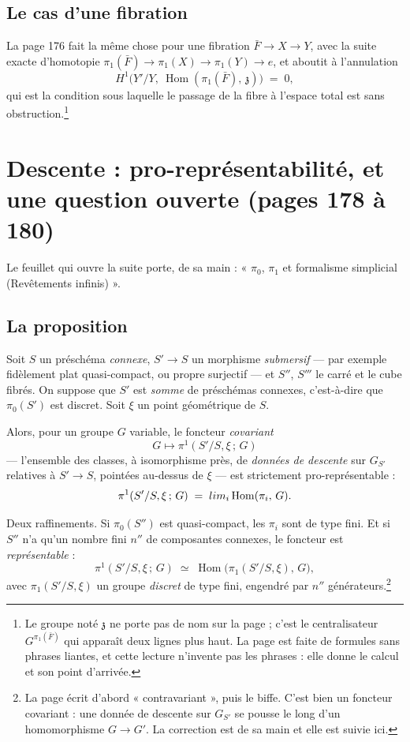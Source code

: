 \documentclass[11pt,a4paper]{article}
\begin{document}
\subsection*{Le cas d'une fibration}

La page 176 fait la même chose pour une fibration $\bar{F} \to X \to Y$, avec
la suite exacte d'homotopie $\pi_{1}(\bar{F}) \to \pi_{1}(X) \to \pi_{1}(Y)
\to e$, et aboutit à l'annulation
\[
  H^{1}\bigl(Y'/Y,\ \operatorname{Hom}(\pi_{1}(\bar{F}),\, \mathfrak{z})\bigr)
  \;=\; 0 ,
\]
qui est la condition sous laquelle le passage de la fibre à l'espace total est
sans obstruction.\footnote{Le groupe noté $\mathfrak{z}$ ne porte pas de nom
sur la page ; c'est le centralisateur $G^{\pi_{1}(\bar{F})}$ qui apparaît deux
lignes plus haut. La page est faite de formules sans phrases liantes, et cette
lecture n'invente pas les phrases : elle donne le calcul et son point
d'arrivée.}

\section*{Descente : pro-représentabilité, et une question ouverte (pages 178 à 180)}

Le feuillet qui ouvre la suite porte, de sa main : « $\pi_{0}$, $\pi_{1}$ et
formalisme simplicial (Revêtements infinis) ».

\subsection*{La proposition}

Soit $S$ un préschéma \emph{connexe}, $S' \to S$ un morphisme
\emph{submersif} --- par exemple fidèlement plat quasi-compact, ou propre
surjectif --- et $S''$, $S'''$ le carré et le cube fibrés. On suppose que $S'$
est \emph{somme} de préschémas connexes, c'est-à-dire que $\pi_{0}(S')$ est
discret. Soit $\xi$ un point géométrique de $S$.

Alors, pour un groupe $G$ variable, le foncteur \emph{covariant}
\[
  G \longmapsto \pi^{1}(S'/S, \xi\,;\, G)
\]
--- l'ensemble des classes, à isomorphisme près, de \emph{données de descente}
sur $G_{S'}$ relatives à $S' \to S$, pointées au-dessus de $\xi$ --- est
strictement pro-représentable :
\[
  \pi^{1}(S'/S, \xi\,;\, G) \;=\; \varinjlim_{i}
  \operatorname{Hom}(\pi_{i},\, G) .
\]

Deux raffinements. Si $\pi_{0}(S'')$ est quasi-compact, les $\pi_{i}$ sont de
type fini. Et si $S''$ n'a qu'un nombre fini $n''$ de composantes connexes, le
foncteur est \emph{représentable} :
\[
  \pi^{1}(S'/S, \xi\,;\, G) \;\simeq\;
  \operatorname{Hom}\bigl(\pi_{1}(S'/S, \xi),\, G\bigr) ,
\]
avec $\pi_{1}(S'/S,\xi)$ un groupe \emph{discret} de type fini, engendré par
$n''$ générateurs.\footnote{La page écrit d'abord « contravariant », puis le
biffe. C'est bien un foncteur covariant : une donnée de descente sur $G_{S'}$
se pousse le long d'un homomorphisme $G \to G'$. La correction est de sa main
et elle est suivie ici.}
\end{document}
